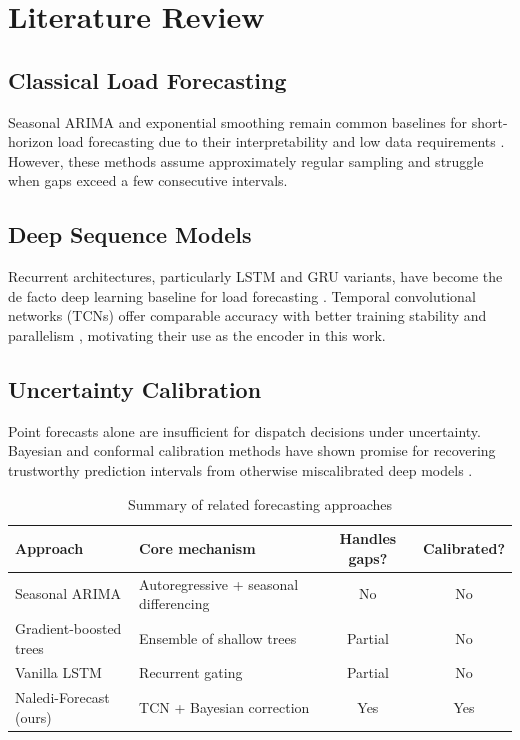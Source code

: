 \documentclass[12pt,a4paper]{report}
\begin{document}
\chapter{Literature Review}

\section{Classical Load Forecasting}
Seasonal ARIMA and exponential smoothing remain common baselines for short-horizon load
forecasting due to their interpretability and low data requirements \cite{box1976time}.
However, these methods assume approximately regular sampling and struggle when gaps exceed
a few consecutive intervals.

\section{Deep Sequence Models}
Recurrent architectures, particularly LSTM and GRU variants, have become the de facto deep
learning baseline for load forecasting \cite{hochreiter1997long}. Temporal convolutional
networks (TCNs) offer comparable accuracy with better training stability and parallelism
\cite{bai2018empirical}, motivating their use as the encoder in this work.

\section{Uncertainty Calibration}
Point forecasts alone are insufficient for dispatch decisions under uncertainty. Bayesian
and conformal calibration methods have shown promise for recovering trustworthy prediction
intervals from otherwise miscalibrated deep models \cite{gal2016dropout}.

\begin{table}[htbp]
\centering
\caption{Summary of related forecasting approaches}
\label{tab:related-work}
\begin{tabularx}{\linewidth}{@{}lXcc@{}}
\toprule
\textbf{Approach} & \textbf{Core mechanism} & \textbf{Handles gaps?} & \textbf{Calibrated?} \\
\midrule
Seasonal ARIMA & Autoregressive + seasonal differencing & No & No \\
Gradient-boosted trees & Ensemble of shallow trees & Partial & No \\
Vanilla LSTM & Recurrent gating & Partial & No \\
Naledi-Forecast (ours) & TCN + Bayesian correction & Yes & Yes \\
\bottomrule
\end{tabularx}
\end{table}
\end{document}
